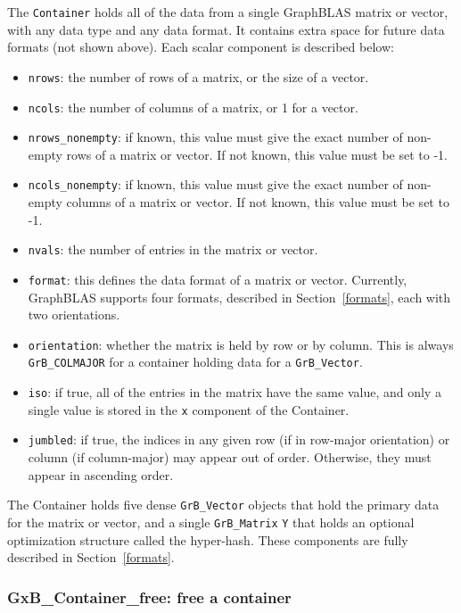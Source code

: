 The \verb'Container' holds all of the data from a single GraphBLAS matrix or
vector, with any data type and any data format.  It contains extra space for
future data formats (not shown above).  Each scalar component is described
below:

\begin{itemize}
\item \verb'nrows': the number of rows of a matrix, or the size of a vector.
\item \verb'ncols': the number of columns of a matrix, or 1 for a vector. 
\item \verb'nrows_nonempty':  if known, this value must give the exact number
    of non-empty rows of a matrix or vector.  If not known, this value must be
    set to -1.
\item \verb'ncols_nonempty':  if known, this value must give the exact number
    of non-empty columns of a matrix or vector.  If not known, this value must be
    set to -1.
\item \verb'nvals': the number of entries in the matrix or vector.
\item \verb'format': this defines the data format of a matrix or vector.
    Currently, GraphBLAS supports four formats, described in
    Section~\ref{formats}, each with two orientations.
\item \verb'orientation':  whether the matrix is held by row or by column.
    This is always \verb'GrB_COLMAJOR' for a container holding data for a
    \verb'GrB_Vector'.
\item \verb'iso': if true, all of the entries in the matrix have the same
    value, and only a single value is stored in the \verb'x' component of
    the Container.
\item \verb'jumbled': if true, the indices in any given row (if in row-major
    orientation) or column (if column-major) may appear out of order.
    Otherwise, they must appear in ascending order.
\end{itemize}

The Container holds five dense \verb'GrB_Vector' objects that hold
the primary data for the matrix or vector, and a single \verb'GrB_Matrix'
\verb'Y' that holds an optional optimization structure called the hyper-hash.
These components are fully described in Section~\ref{formats}.

\subsubsection{{\sf GxB\_Container\_free:} free a container}
\label{container_free}

